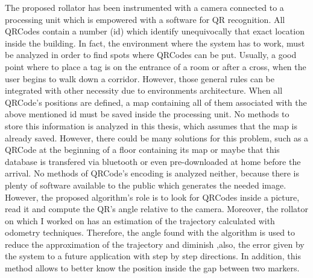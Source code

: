 The proposed rollator has been instrumented with a camera connected to a processing unit which is empowered with a software for QR recognition.
All QRCodes contain a number (id) which identify unequivocally that exact location inside the building. In fact, the environment where the system has to work, must be analyzed in order to find spots where QRCodes can be put.
Usually, a good point where to place a tag is on the entrance of a room or after a cross, when the user begins to walk down a corridor. However, those general rules can be integrated with other necessity due to environments architecture. 
When all QRCode's positions are defined, a map containing all of them associated with the above mentioned id must be saved inside the processing unit.\newline
No methods to store this information is analyzed in this thesis, which assumes that the map is already saved. However, there could be many solutions for this problem, such as a QRCode at the beginning of a floor containing its map or maybe that this database is transfered via bluetooth or even pre-downloaded at home before the arrival. No methods of QRCode's encoding is analyzed neither, because there is plenty of software available to the public which generates the needed image.
\newline
However, the proposed algorithm's role is to look for QRCodes inside a picture, read it and compute the QR's angle relative to the camera. Moreover, the rollator on which I worked on has an estimation of the trajectory calculated with odometry techniques. Therefore, the angle found with the algorithm is used to reduce the approximation of the trajectory and diminish ,also, the error given by the system to a future application with step by step directions. In addition, this method allows to better know the position inside the gap between two markers.






   













  
